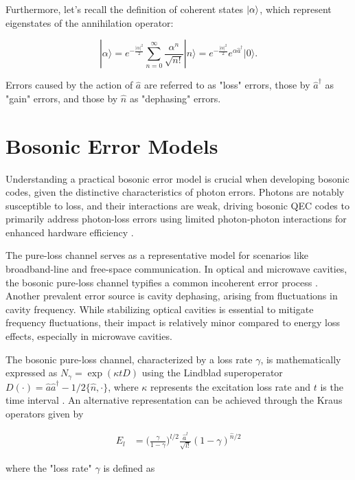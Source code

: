 \documentclass[11pt]{article}
\newcommand\0{\mathbf{0}}
\newcommand\<{\langle}
\renewcommand\>{\rangle}
\begin{document}
Furthermore, let's recall the definition of coherent states \(\ket{\alpha}\), which represent eigenstates of the annihilation operator:

\[
|\alpha\rangle = e^{-\frac{|\alpha|^2}{2}} \sum_{n=0}^{\infty} \frac{\alpha^n}{\sqrt{n!}} |n\rangle = e^{-\frac{|\alpha|^2}{2}} e^{\alpha\hat{a}^\dagger} |0\rangle.
\]

Errors caused by the action of \(\hat{a}\) are referred to as "loss" errors, those by \(\hat{a}^\dag\) as "gain" errors, and those by \(\hat{n}\) as "dephasing" errors.


\section{Bosonic Error Models}

Understanding a practical bosonic error model is crucial when developing bosonic codes, given the distinctive characteristics of photon errors. Photons are notably susceptible to loss, and their interactions are weak, driving bosonic QEC codes to primarily address photon-loss errors using limited photon-photon interactions for enhanced hardware efficiency \cite{niu2018hardware}.

The pure-loss channel serves as a representative model for scenarios like broadband-line and free-space communication. In optical and microwave cavities, the bosonic pure-loss channel typifies a common incoherent error process \cite{albert2017performance}. Another prevalent error source is cavity dephasing, arising from fluctuations in cavity frequency. While stabilizing optical cavities is essential to mitigate frequency fluctuations, their impact is relatively minor compared to energy loss effects, especially in microwave cavities.

The bosonic pure-loss channel, characterized by a loss rate $\gamma$, is mathematically expressed as $N_\gamma = \exp(\kappa t D)$ using the Lindblad superoperator $D(\cdot) = \hat{a} \hat{a}^\dag - 1/2 \{ \hat{n} , \cdot \}$, where $\kappa$ represents the excitation loss rate and $t$ is the time interval \cite{albert2017performance}. An alternative representation can be achieved through the Kraus operators given by

\begin{align}
\label{eq:kraus}
E_l &= \Big(\frac{\gamma}{1-\gamma}\Big)^{l / 2} \frac{\hat{a}^l}{\sqrt{l!}}(1 - \gamma)^{\hat{n} / 2}
\end{align}

where the "loss rate" $\gamma$ is defined as
\end{document}
